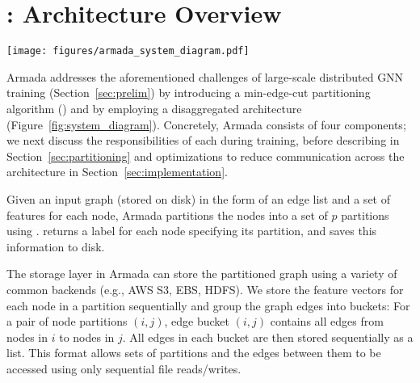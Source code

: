 \section{\systemname: Architecture Overview}
\label{sec:overview}



\begin{figure*}[!t]
  \centering
  \texttt{[image: figures/armada\_system\_diagram.pdf]}
  \vspace{-0.25in}
  \caption{\systemname system diagram. \textbf{A.} Graph data is partitioned using \partitioning (Section~\ref{sec:partitioning}) and then \textbf{B.} stored on disk in the storage layer. \textbf{C.} A disaggregated mini batch preparation layer loads graph partitions into memory and prepares mini batches for workers in the compute layer. \textbf{D.} The compute workers process these mini batches on GPUs and periodically synchronize dense model parameters.}
  \label{fig:system_diagram}
\end{figure*}



Armada addresses the aforementioned challenges of large-scale distributed GNN training (Section~\ref{sec:prelim}) by introducing a min-edge-cut partitioning algorithm (\partitioning) and by employing a disaggregated architecture (Figure~\ref{fig:system_diagram}). Concretely, Armada consists of four components; we next discuss the responsibilities of each during training, before describing \partitioning in Section~\ref{sec:partitioning} and optimizations to reduce communication across the architecture in Section~\ref{sec:implementation}. 



Given an input graph (stored on disk) in the form of an edge list and a set of features for each node, Armada partitions the nodes into a set of $p$ partitions using \textit{\partitioning}. \partitioning returns a label for each node specifying its partition, and saves this information to disk.



The storage layer in Armada can store the partitioned graph using a variety of common backends (e.g., AWS S3, EBS, HDFS). We store the feature vectors for each node in a partition sequentially and group the graph edges into buckets: For a pair of node partitions $(i, j)$, edge bucket $(i, j)$ contains all edges from nodes in $i$ to nodes in $j$. All edges in each bucket are then stored sequentially as a list. This format allows sets of partitions and the edges between them to be accessed using only sequential file reads/writes. 



